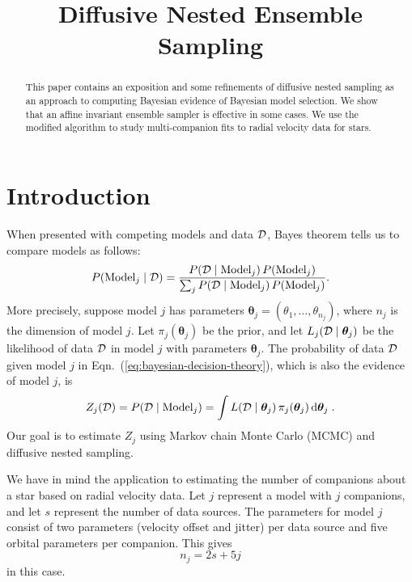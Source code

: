 \documentclass[letterpaper, preprint]{aastex}
\newcommand{\bth} {\boldsymbol \theta}
\newcommand{\md}{\mathrm{d}}
\begin{document}
\title{
  Diffusive Nested Ensemble Sampling
}

\begin{abstract}
This paper contains an exposition and some refinements of diffusive nested sampling as an approach to computing Bayesian evidence of Bayesian model selection. We show that an affine invariant ensemble sampler is effective in some cases. We use the modified algorithm to study multi-companion fits to radial velocity data for stars. 

\end{abstract}


\section{Introduction}

When presented with competing models and data $\cal D$, Bayes theorem tells us to compare models as follows:
\begin{equation}
P(\mathrm{Model}_j\mid{\cal D})=\frac{P({\cal D}\mid\mathrm{Model}_j)\,P(\mathrm{Model}_j)}{\sum_j{P({\cal D}\mid\mathrm{Model}_j)\,P(\mathrm{Model}_j)}}.
\label{eq:bayesian-decision-theory}
\end{equation}
More precisely, suppose model $j$ has parameters $\bth_j = (\theta_1,\ldots,\theta_{n_j})$, where $n_j$ is the dimension of model $j$. Let $\pi_j(\bth_j)$ be the prior, and let $L_j({\cal D}\mid\bth_j)$ be the likelihood of data $\cal D$ in model $j$ with parameters $\bth_j$. The probability of data $\cal D$ given model $j$ in Eqn.~(\ref{eq:bayesian-decision-theory}), which is also the evidence of model $j$, is
\begin{equation}
Z_j({\cal D}) = P({\cal D}\mid\mathrm{Model}_j) = \int L({\cal D}\mid \bth_j)\, \pi_j(\bth_j) \,\md\bth_j \; .
\label{eqn:Zj}
\end{equation}
Our goal is to estimate $Z_j$ using Markov chain Monte Carlo (MCMC) and diffusive nested sampling.

We have in mind the application to estimating the number of companions about a star based on radial velocity data. Let $j$ represent a model with $j$ companions, and let $s$ represent the number of data sources. The parameters for model $j$ consist of two parameters (velocity offset and jitter) per data source and five orbital parameters per companion. This gives
\[
n_j=2s+5j
\]
in this case.
\end{document}
